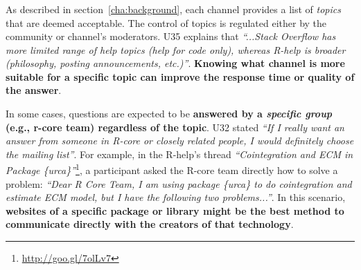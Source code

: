 \subsubsection{\reca}


    As described in section~\ref{cha:background}, each channel provides a list of \textit{topics} that are deemed acceptable.
    The control of topics is regulated either by the community or channel's moderators.
    U35 explains that \textit{``...Stack Overflow has more limited range of help topics (help for code only), whereas R-help is broader (philosophy, posting announcements, etc.)''}.
    \textbf{Knowing what channel is more suitable for a specific topic can improve the response time or quality of the answer}.


    In some cases, questions are expected to be \textbf{answered by a \textit{specific group} (e.g., r-core team) regardless of the topic}.
    U32 stated \textit{``If I really want an answer from someone in R-core or closely related people, I would definitely choose the mailing list''}.
    For example, in the R-help's thread \textit{``Cointegration and ECM in Package \{urca\}''}\footnote{\url{http://goo.gl/7olLv7}}, a participant asked the R-core team directly how to solve a problem: \textit{``Dear R Core Team, I am using package \{urca\} to do cointegration and estimate ECM model, but I have the following two problems...''}.
    In this scenario, \textbf{websites of a specific package or library might be the best method to communicate directly with the creators of that technology}.
     


